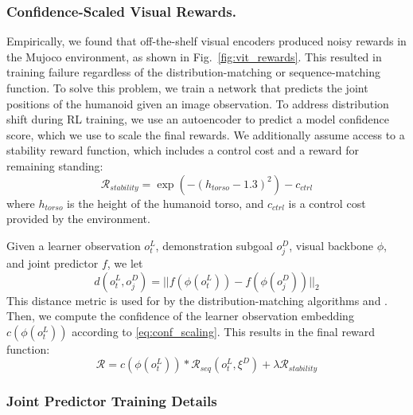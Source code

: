 

% 
\subsubsection{Confidence-Scaled Visual Rewards.}
\label{subsubsec:mujoco_visual_encoder}
Empirically, we found that off-the-shelf visual encoders produced noisy rewards in the Mujoco environment, as shown in Fig.~\ref{fig:vit_rewards}. This resulted in training failure regardless of the distribution-matching or sequence-matching function. To solve this problem, we train a network that predicts the joint positions of the humanoid given an image observation. To address distribution shift during RL training, we use an autoencoder to predict a model confidence score, which we use to scale the final rewards. We additionally assume access to a stability reward function, which includes a control cost and a reward for remaining standing:
\begin{equation}
\mathcal{R}_{stability} = \exp(- (h_{torso} - 1.3)^2)  - c_{ctrl}
\end{equation}
where $h_{torso}$ is the height of the humanoid torso, and $c_{ctrl}$ is a control cost provided by the environment.

Given a learner observation $o^L_t$, demonstration subgoal $o^D_j$, visual backbone $\phi$, and joint predictor $f$, we let 
\begin{equation}d(o^L_t, o^D_j) = ||f(\phi(o^L_t)) - f(\phi(o^D_j)) ||_2\end{equation}
This distance metric is used for by the distribution-matching algorithms and \orca{}. Then, we compute the confidence of the learner observation embedding $c(\phi(o^L_t))$ according to \ref{eq:conf_scaling}. This results in the final reward function:
\begin{equation}
\mathcal{R} = c(\phi(o^L_t)) * \mathcal{R}_{seq}(o_t^L, \xi^D) + \lambda \mathcal{R}_{stability}
\end{equation}


\subsubsection{Joint Predictor Training Details}

